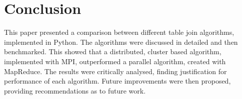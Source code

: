 \documentclass[10.5 pt, conference]{IEEEtran}
\begin{document}
\section{Conclusion}
This paper presented a comparison between different table join algorithms, implemented in Python. The algorithms were discussed in detailed and then benchmarked. This showed that a distributed, cluster based algorithm, implemented with MPI, outperformed a parallel algorithm, created with MapReduce. The results were critically analysed, finding justification for performance of each algorithm. Future improvements were then proposed, providing recommendations as to future work.  

\newpage


\end{document}
